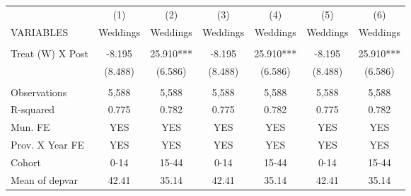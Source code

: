 \begin{tabular}{lcccccc} \hline
 & (1) & (2) & (3) & (4) & (5) & (6) \\
VARIABLES & Weddings & Weddings & Weddings & Weddings & Weddings & Weddings \\ \hline
 &  &  &  &  &  &  \\
Treat (W) X Post & -8.195 & 25.910*** & -8.195 & 25.910*** & -8.195 & 25.910*** \\
 & (8.488) & (6.586) & (8.488) & (6.586) & (8.488) & (6.586) \\
 &  &  &  &  &  &  \\
Observations & 5,588 & 5,588 & 5,588 & 5,588 & 5,588 & 5,588 \\
R-squared & 0.775 & 0.782 & 0.775 & 0.782 & 0.775 & 0.782 \\
Mun. FE & YES & YES & YES & YES & YES & YES \\
Prov. X Year FE & YES & YES & YES & YES & YES & YES \\
Cohort & 0-14 & 15-44 & 0-14 & 15-44 & 0-14 & 15-44 \\
 Mean of depvar & 42.41 & 35.14 & 42.41 & 35.14 & 42.41 & 35.14 \\ \hline
\end{tabular}
